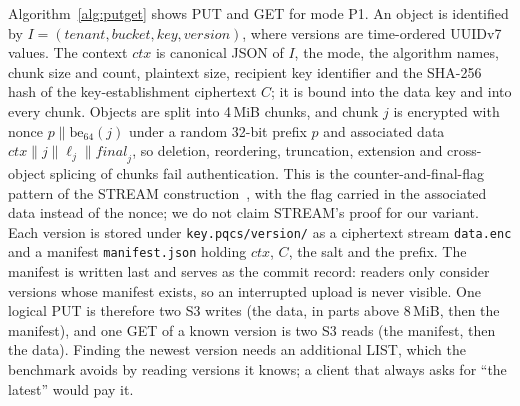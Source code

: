 \documentclass[review,12pt]{elsarticle}
\begin{document}
Algorithm~\ref{alg:putget} shows PUT and GET for mode P1. An object is identified by
$I=(\mathit{tenant},\mathit{bucket},\mathit{key},\mathit{version})$, where versions are
time-ordered UUIDv7 values. The context $\mathit{ctx}$ is canonical JSON of $I$, the mode, the
algorithm names, chunk size and count, plaintext size, recipient key identifier and the SHA-256
hash of the key-establishment ciphertext $C$; it is bound into the data key and into every chunk.
Objects are split into 4\,MiB chunks, and chunk $j$ is encrypted with nonce
$p\|\mathrm{be}_{64}(j)$ under a random 32-bit prefix $p$ and associated data
$\mathit{ctx}\|j\|\ell_j\|\mathit{final}_j$, so deletion, reordering, truncation, extension and
cross-object splicing of chunks fail authentication. This is the counter-and-final-flag pattern
of the STREAM construction~\cite{hoang2015}, with the flag carried in the associated data
instead of the nonce; we do not claim STREAM's proof for our variant. Each version is stored under
\texttt{key.pqcs/version/} as a ciphertext stream \texttt{data.enc} and a manifest
\texttt{manifest.json} holding $\mathit{ctx}$, $C$, the salt and the prefix. The manifest is
written last and serves as the commit record: readers only consider versions whose manifest
exists, so an interrupted upload is never visible. One logical PUT is therefore two S3 writes
(the data, in parts above 8\,MiB, then the manifest), and one GET of a known version is two S3
reads (the manifest, then the data). Finding the newest version needs an additional LIST, which
the benchmark avoids by reading versions it knows; a client that always asks for ``the latest''
would pay it.
\end{document}
